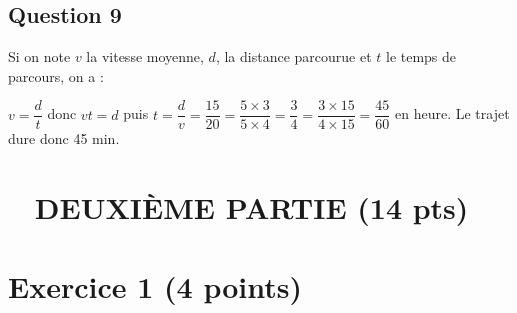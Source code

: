 \documentclass[12pt,a4paper,french]{article}
\begin{document}
\subsection*{Question 9}

Si on note $v$ la vitesse moyenne, $d$, la distance parcourue et $t$ le temps de parcours, on a :

$v = \dfrac{d}{t}$ \quad donc \quad $vt = d$ puis $t = \dfrac{d}{v} = \dfrac{15}{20} = \dfrac{5\times 3}{5\times 4} = {\dfrac{3}{4}} = \dfrac{3 \times 15}{4 \times 15} = \dfrac{45}{60}$ en heure.
\quad
Le trajet dure  donc 45 min.

\section*{\hfill~ DEUXIÈME PARTIE (14 pts)\hfill~}

\section*{Exercice 1 (4 points)}
\end{document}
